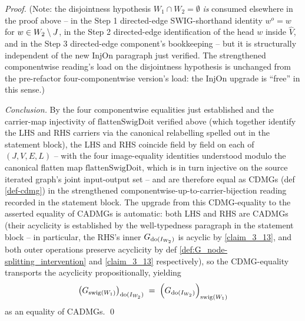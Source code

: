 \documentclass[main]{subfiles}
\providecommand{\flattenSwigDoit}{\mathrm{flattenSwigDoit}}
\begin{document}
\begin{proof}
(Note: the disjointness hypothesis $W_1 \cap W_2 = \emptyset$ \emph{is} consumed elsewhere in the proof above -- in the Step 1 directed-edge SWIG-shorthand identity $w^o = w$ for $w \in W_2 \setminus J$, in the Step 2 directed-edge identification of the head $w$ inside $\hat V$, and in the Step 3 directed-edge component's bookkeeping -- but it is structurally independent of the new InjOn paragraph just verified. The strengthened componentwise reading's load on the disjointness hypothesis is unchanged from the pre-refactor four-componentwise version's load: the InjOn upgrade is ``free'' in this sense.)

\smallskip\noindent\emph{Conclusion.}
By the four componentwise equalities just established and the carrier-map injectivity of $\flattenSwigDoit$ verified above (which together identify the LHS and RHS carriers via the canonical relabelling spelled out in the statement block), the LHS and RHS coincide field by field on each of $(J, V, E, L)$ -- with the four image-equality identities understood modulo the canonical flatten map $\flattenSwigDoit$, which is in turn injective on the source iterated graph's joint input-output set -- and are therefore equal as CDMGs (def \ref{def-cdmg}) in the strengthened componentwise-up-to-carrier-bijection reading recorded in the statement block. The upgrade from this CDMG-equality to the asserted equality of CADMGs is automatic: both LHS and RHS are CADMGs (their acyclicity is established by the well-typedness paragraph in the statement block -- in particular, the RHS's inner $G_{\operatorname{do}(I_{W_2})}$ is acyclic by \ref{claim_3_13}, and both outer operations preserve acyclicity by def \ref{def:G_node-splitting_intervention} and \ref{claim_3_13} respectively), so the CDMG-equality transports the acyclicity propositionally, yielding
\[
    \left ( G_{\mathrm{swig}(W_1)} \right )_{\operatorname{do}(I_{W_2})} \;=\; \left ( G_{\operatorname{do}(I_{W_2})} \right )_{\mathrm{swig}(W_1)}
\]
as an equality of CADMGs. \qed
\end{proof}
\end{document}
